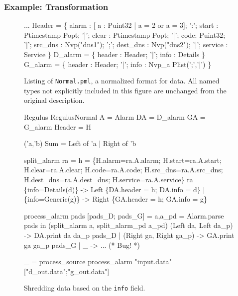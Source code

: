 \subsubsection{Example: Transformation}
\label{sec:ex-trans}

\begin{figure}
  \centering
  \begin{code}\scriptsize
...
 Header = \{
       alarm : [ a : Puint32 | a = 2 or a = 3];
 ':';  start :  Ptimestamp Popt;
 '|';  clear :  Ptimestamp Popt;
 '|';  code: Puint32;
 '|';  src\_dns  :  Nvp("dns1");
 ';';  dest\_dns :  Nvp("dns2");
 '|';  service  : Service
\}
\mbox{}
 D\_alarm = \{
       header : Header;
 '|';  info   : Details
 \}
\mbox{}
 G\_alarm = \{
       header : Header;
 '|';  info   : Nvp\_a Plist(';','|')
\}\end{code}
\caption{Listing of \texttt{\darkstar{}Normal.pml}, a normalized format for
  \darkstar{} data. All named types not explicitly included in this
  figure are unchanged from the original \darkstar{} description.}
\label{fig:normal-darkstar}
\end{figure}

\begin{figure}
\begin{code}\scriptsize
{} Regulus
 RegulusNormal
 A = Alarm
 DA = D\_alarm
 GA = G\_alarm
 Header = H

 ('a,'b) Sum = Left of 'a | Right of 'b

 split_alarm ra =
     h = 
       \{H.alarm=ra.A.alarm; H.start=ra.A.start; 
        H.clear=ra.A.clear; H.code=ra.A.code;
        H.src\_dns=ra.A.src\_dns; 
        H.dest\_dns=ra.A.dest\_dns;
        H.service=ra.A.service\}
      ra 
        \{info=Details(d)\} -> 
        Left \{DA.header = h; DA.info = d\}
      | \{info=Generic(g)\} ->
        Right \{GA.header = h; GA.info = g\}

 process_alarm pads [pads_D; pads_G] = 
   a,a_pd = Alarm.parse pads in
     (split_alarm a, split_alarm_pd a_pd) 
	(Left  da, Left  da_p) -> DA.print da da_p pads_D
      | (Right ga, Right ga_p) -> GA.print ga ga_p pads_G
      | _ -> ... (* Bug! *)

 _ = process_source process_alarm 
                "input.data" ["d_out.data";"g_out.data"]
  \end{code}
  \caption{Shredding \darkstar{} data based on the {\tt info} field.}
  \label{fig:ex-no-err-check}
\end{figure}

